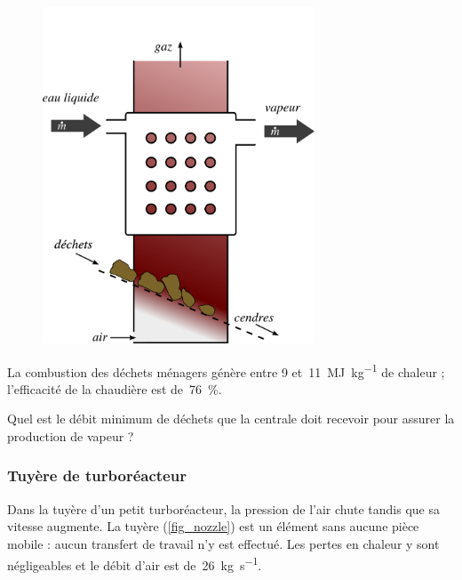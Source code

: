 	\begin{figure}
		\begin{center}
			\includegraphics[height=10cm, max width=0.9\columnwidth]{images/boiler.png}
		\end{center}
		\label{fig_boiler}
	\end{figure}
	
	La combustion des déchets ménagers génère entre \num{9} et~\SI{11}{\mega\joule\per\kilogram} de chaleur ; l’efficacité de la chaudière est de~\SI{76}{\percent}.
	
	Quel est le débit minimum de déchets que la centrale doit recevoir pour assurer la production de vapeur ?
	

\subsubsection{Tuyère de turboréacteur}
\label{exo_tuyere_turboreacteur}

	Dans la tuyère d’un petit turboréacteur, la pression de l’air chute tandis que sa vitesse augmente. La tuyère (\cref{fig_nozzle}) est un élément sans aucune pièce mobile : aucun transfert de travail n’y est effectué. Les pertes en chaleur y sont négligeables et le débit d’air est de~\SI{26}{\kilogram\per\second}. 

